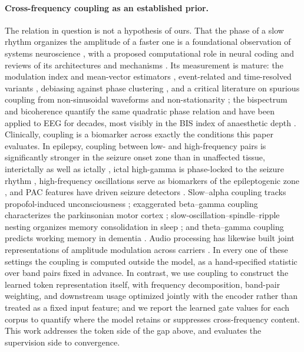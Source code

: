\paragraph{Cross-frequency coupling as an established prior.}
The relation in question is not a hypothesis of ours. That the phase of a
slow rhythm organizes the amplitude of a faster one is a foundational
observation of systems neuroscience \citep{jensen2007cross,canolty2006high},
with a proposed computational role in neural coding \citep{lisman2013theta}
and reviews of its architectures and mechanisms
\citep{canolty2010functional,hyafil2015neural}. Its measurement is mature:
the modulation index \citep{tort2010measuring} and mean-vector estimators
\citep{canolty2006high}, event-related and time-resolved variants
\citep{voytek2013method}, debiasing against phase clustering
\citep{vandriel2015phase}, and a critical literature on spurious coupling
from non-sinusoidal waveforms and non-stationarity
\citep{aru2015untangling,cole2017brain}; the bispectrum and bicoherence
quantify the same quadratic phase relation and have been applied to EEG for
decades, most visibly in the BIS index of anaesthetic depth
\citep{sigl1994introduction,rampil1998primer}. Clinically, coupling is a
biomarker across exactly the conditions this paper evaluates. In epilepsy,
coupling between low- and high-frequency pairs is significantly stronger
in the seizure onset zone than in unaffected tissue, interictally as well
as ictally \citep{amiri2016phase}, ictal high-gamma is phase-locked to the
seizure rhythm \citep{weiss2013ictal}, high-frequency oscillations serve as
biomarkers of the epileptogenic zone \citep{jacobs2012high,zijlmans2012high},
and PAC features have driven seizure detectors \citep{edakawa2016detection}.
Slow--alpha coupling tracks propofol-induced unconsciousness
\citep{purdon2013electroencephalogram}; exaggerated beta--gamma coupling
characterizes the parkinsonian motor cortex
\citep{dehemptinne2013exaggerated}; slow-oscillation--spindle--ripple
nesting organizes memory consolidation in sleep
\citep{staresina2015hierarchical}; and theta--gamma coupling predicts
working memory in dementia \citep{goodman2018theta}. Audio processing has
likewise built joint representations of amplitude modulation across
carriers \citep{singh2003modulation}. In every one of these settings the
coupling is computed outside the model, as a hand-specified statistic over
band pairs fixed in advance. In contrast, we use coupling to construct the
learned token representation itself, with frequency decomposition,
band-pair weighting, and downstream usage optimized jointly with the
encoder rather than treated as a fixed input feature; and we report the
learned gate values for each corpus to quantify where the model retains or
suppresses cross-frequency content. This work addresses the token side of
the gap above, and evaluates the supervision side to convergence.
